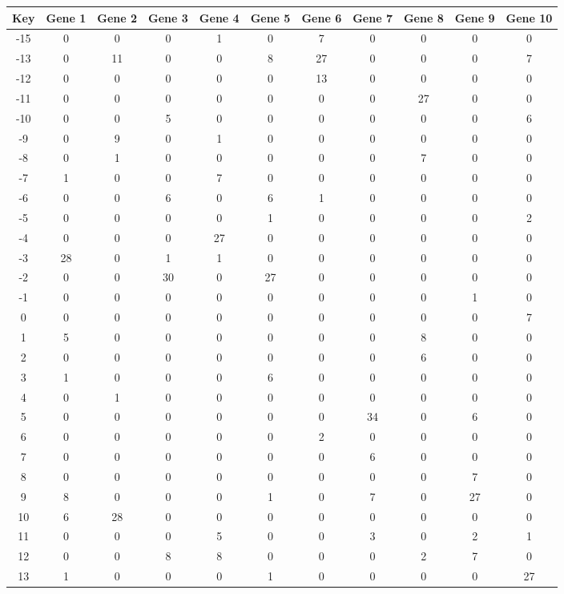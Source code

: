 \begin{tabular}{|c|c|c|c|c|c|c|c|c|c|c|}
\hline
Key & Gene 1 & Gene 2 & Gene 3 & Gene 4 & Gene 5 & Gene 6 & Gene 7 & Gene 8 & Gene 9 & Gene 10 \\
\hline
-15 & 0 & 0 & 0 & 1 & 0 & 7 & 0 & 0 & 0 & 0 \\
-13 & 0 & 11 & 0 & 0 & 8 & 27 & 0 & 0 & 0 & 7 \\
-12 & 0 & 0 & 0 & 0 & 0 & 13 & 0 & 0 & 0 & 0 \\
-11 & 0 & 0 & 0 & 0 & 0 & 0 & 0 & 27 & 0 & 0 \\
-10 & 0 & 0 & 5 & 0 & 0 & 0 & 0 & 0 & 0 & 6 \\
-9 & 0 & 9 & 0 & 1 & 0 & 0 & 0 & 0 & 0 & 0 \\
-8 & 0 & 1 & 0 & 0 & 0 & 0 & 0 & 7 & 0 & 0 \\
-7 & 1 & 0 & 0 & 7 & 0 & 0 & 0 & 0 & 0 & 0 \\
-6 & 0 & 0 & 6 & 0 & 6 & 1 & 0 & 0 & 0 & 0 \\
-5 & 0 & 0 & 0 & 0 & 1 & 0 & 0 & 0 & 0 & 2 \\
-4 & 0 & 0 & 0 & 27 & 0 & 0 & 0 & 0 & 0 & 0 \\
-3 & 28 & 0 & 1 & 1 & 0 & 0 & 0 & 0 & 0 & 0 \\
-2 & 0 & 0 & 30 & 0 & 27 & 0 & 0 & 0 & 0 & 0 \\
-1 & 0 & 0 & 0 & 0 & 0 & 0 & 0 & 0 & 1 & 0 \\
0 & 0 & 0 & 0 & 0 & 0 & 0 & 0 & 0 & 0 & 7 \\
1 & 5 & 0 & 0 & 0 & 0 & 0 & 0 & 8 & 0 & 0 \\
2 & 0 & 0 & 0 & 0 & 0 & 0 & 0 & 6 & 0 & 0 \\
3 & 1 & 0 & 0 & 0 & 6 & 0 & 0 & 0 & 0 & 0 \\
4 & 0 & 1 & 0 & 0 & 0 & 0 & 0 & 0 & 0 & 0 \\
5 & 0 & 0 & 0 & 0 & 0 & 0 & 34 & 0 & 6 & 0 \\
6 & 0 & 0 & 0 & 0 & 0 & 2 & 0 & 0 & 0 & 0 \\
7 & 0 & 0 & 0 & 0 & 0 & 0 & 6 & 0 & 0 & 0 \\
8 & 0 & 0 & 0 & 0 & 0 & 0 & 0 & 0 & 7 & 0 \\
9 & 8 & 0 & 0 & 0 & 1 & 0 & 7 & 0 & 27 & 0 \\
10 & 6 & 28 & 0 & 0 & 0 & 0 & 0 & 0 & 0 & 0 \\
11 & 0 & 0 & 0 & 5 & 0 & 0 & 3 & 0 & 2 & 1 \\
12 & 0 & 0 & 8 & 8 & 0 & 0 & 0 & 2 & 7 & 0 \\
13 & 1 & 0 & 0 & 0 & 1 & 0 & 0 & 0 & 0 & 27 \\
\hline
\end{tabular}